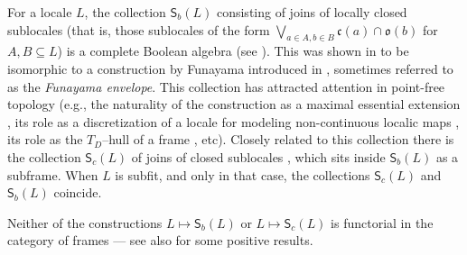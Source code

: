 \documentclass[11pt,a4paper,reqno]{amsart}
\newcommand{\tbigvee}{\mathop{\textstyle \bigvee }}%
\def\SS{\mathsf{S}}
\def\cl{\mathfrak{c}}
\def\op{\mathfrak{o}}
\theoremstyle{definition}
\theoremstyle{remark}
\newcommand{\mf}{\mathsf}
\newcommand{\se}{\subseteq}
\newcommand{\ve}{\vee}
\newcommand{\bca}{\bigcap}
\newcommand{\sll}{\mf{S}(L)}
\newcommand{\Sb}{\mf{S}_b}
\begin{document}

For a locale $L$, the collection $\SS_b(L)$ consisting of joins of locally closed sublocales (that is, those sublocales of the form $\tbigvee_{a\in A,b\in B} \cl(a)\cap\op(b)$ for $A,B\subseteq L$) is a complete Boolean algebra  (see \cite{Arrieta2022}). This was shown in \cite{BGJ2013} to be isomorphic to a construction by Funayama introduced in \cite{funayama59}, sometimes referred to as the \emph{Funayama envelope}.
This collection has attracted attention in point-free topology (e.g., the naturality of the construction as a maximal essential extension \cite{ball2018}, its role as
a discretization of a locale for modeling non-continuous localic maps \cite{DISCB}, its role as the $T_D$--hull of a frame \cite{bezhanishvili2025td}, etc). 
Closely related to this collection there is the collection $\SS_c(L)$ of joins of closed sublocales \cite{PicadoPultrTozzi2019}, which sits inside $\SS_b(L)$ as a subframe. When $L$ is subfit, and only in that case, the collections $\SS_c(L)$ and $\SS_b(L)$ coincide.

Neither of the constructions $L\mapsto \SS_b(L)$ or $L\mapsto \SS_c(L)$ is functorial in the category of frames \cite{ball2019,Arrieta2022} --- see also \cite[Section~7.7]{ArrietaPhD2022} for some positive results. 
\end{document}
